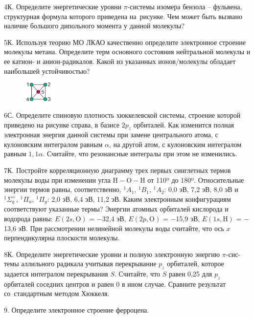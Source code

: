 4К. Определите энергетические уровни $\pi$-системы изомера бензола – фульвена, структурная формула которого приведена на~рисунке. Чем может быть вызвано наличие большого дипольного момента у данной молекулы?
\par
5К. Используя теорию МО ЛКАО качественно определите электронное строение молекулы метана. Определите терм основного состояния нейтральной молекулы и ее катион- и анион-радикалов. Какой из указанных ионов/молекулы обладает наибольшей устойчивостью?
\par
\begin{figure} %
    \centering
    \vspace{0mm}
    \includegraphics[width=17mm]{images/Fig_1_7_6.png}
    \vspace{-3.6mm}
\end{figure}
6С. Определите спиновую плотность хюккелевской системы, строение которой приведено на рисунке справа, в базисе $2p_z$ орбиталей. Как изменится полная электронная энергия данной системы при замене центрального атома, с кулоновским интегралом равным $\alpha$, на другой атом, с кулоновским интегралом равным $1,1\alpha$. Считайте, что резонансные интегралы при этом не изменились.
\par
7К. Постройте корреляционную диаграмму трех первых синглетных термов молекулы воды при изменении угла $\text{H}-\text{O}-\text{H}$ от 110º до 180º. Относительные энергии термов равны, соответственно, $^1A_1$, $^1B_1$, $^1A_2$: 0,0 эВ, 7,2 эВ, 8,0 эВ и $^1\Sigma _g^+$, $^1\Pi _u$, $^1\Pi _g$: 2,0 эВ, 6,4 эВ, 11,2 эВ. Каким электронным конфигурациям соответствуют указанные термы? Энергии атомных орбиталей кислорода и водорода равны: $E(2s,\text{O})$ = $-$32,4 эВ, $E(2p,\text{O})$ = $-$15,9 эВ, $E(1s,\text{H})$ = $-$13,6 эВ. При рассмотрении нелинейной молекулы воды считайте, что ось $x$ перпендикулярна плоскости молекулы.
\par
8К. Определите энергетические уровни и полную электронную энергию $\pi$-сис-темы аллильного радикала учитывая перекрывание $p_z$ орбиталей, которое задается интегралом перекрывания $S$. Считайте, что $S$ равен 0,25 для $p_z$ орбиталей соседних центров и равен 0 в ином случае. Сравните результат со~стандартным методом Хюккеля.
\par
9. Определите электронное строение ферроцена.
\par
